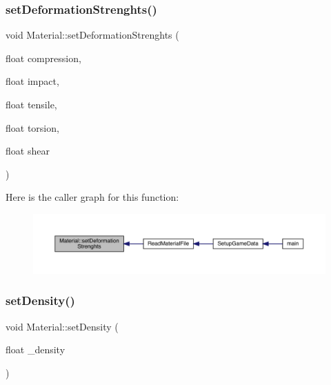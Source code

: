 \mbox{\label{class_material_a24b0f9d7ae4787f66ef055f70f63b240}} 
\subsubsection{\texorpdfstring{set\+Deformation\+Strenghts()}{setDeformationStrenghts()}}
{\footnotesize\ttfamily void Material\+::set\+Deformation\+Strenghts (\begin{DoxyParamCaption}\item[{float}]{compression,  }\item[{float}]{impact,  }\item[{float}]{tensile,  }\item[{float}]{torsion,  }\item[{float}]{shear }\end{DoxyParamCaption})}

Here is the caller graph for this function\+:
\nopagebreak
\begin{figure}[H]
\begin{center}
\leavevmode
\includegraphics[width=350pt]{class_material_a24b0f9d7ae4787f66ef055f70f63b240_icgraph}
\end{center}
\end{figure}
\mbox{\label{class_material_ab7aca2e9daaf35b5b8a45ee677c07073}} 
\subsubsection{\texorpdfstring{set\+Density()}{setDensity()}}
{\footnotesize\ttfamily void Material\+::set\+Density (\begin{DoxyParamCaption}\item[{float}]{\+\_\+density }\end{DoxyParamCaption})}

